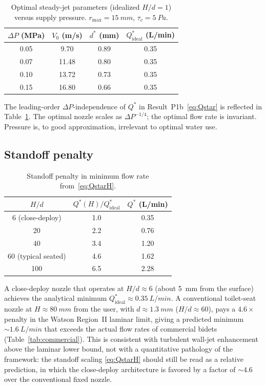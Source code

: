 \documentclass[10pt,letterpaper]{article}
\begin{document}
\begin{table}[h]
\centering
\caption{Optimal steady-jet parameters (idealized $H/d = 1$) versus
supply pressure. $r_\mathrm{max} = 15~mm$, $\tau_c = 5~Pa$.}
\label{tab:pressure}
\begin{tabular}{cccc}
\toprule
$\Delta P$ (MPa) & $V_0$ (m/s) & $d^*$ (mm) & $Q^*_\mathrm{ideal}$ (L/min) \\
\midrule
0.05 & 9.70  & 0.89 & 0.35 \\
0.07 & 11.48 & 0.80 & 0.35 \\
0.10 & 13.72 & 0.73 & 0.35 \\
0.15 & 16.80 & 0.66 & 0.35 \\
\bottomrule
\end{tabular}
\end{table}

The leading-order $\Delta P$-independence of $Q^*$ in
Result~P1b~\eqref{eq:Qstar} is reflected in Table~\ref{tab:pressure}.
The optimal nozzle scales as $\Delta P^{-1/4}$; the optimal flow rate
is invariant. Pressure is, to good approximation, irrelevant to optimal
water use.

\subsection{Standoff penalty}

\begin{table}[h]
\centering
\caption{Standoff penalty in minimum flow rate from~\eqref{eq:QstarH}.}
\label{tab:standoff}
\begin{tabular}{ccc}
\toprule
$H/d$ & $Q^*(H)/Q^*_\mathrm{ideal}$ & $Q^*$ (L/min) \\
\midrule
6 (close-deploy) & 1.0 & 0.35 \\
20 & 2.2 & 0.76 \\
40 & 3.4 & 1.20 \\
60 (typical seated) & 4.6 & 1.62 \\
100 & 6.5 & 2.28 \\
\bottomrule
\end{tabular}
\end{table}

A close-deploy nozzle that operates at $H/d \approx 6$ (about
5~mm from the surface) achieves the analytical minimum
$Q^*_\mathrm{ideal} \approx 0.35~L/min$. A conventional
toilet-seat nozzle at $H \approx 80~mm$ from the user, with
$d \approx 1.3~mm$ ($H/d \approx 60$), pays a $4.6\times$ penalty
in the Watson Region~II laminar limit, giving a predicted minimum
$\sim\!1.6~L/min$ that exceeds the actual flow rates of
commercial bidets (Table~\ref{tab:commercial}). This is consistent
with turbulent wall-jet enhancement above the laminar lower bound,
not with a quantitative pathology of the framework: the standoff
scaling \eqref{eq:QstarH} should still be read as a relative
prediction, in which the close-deploy architecture is
favored by a factor of $\sim 4.6$ over the conventional fixed
nozzle.
\end{document}
